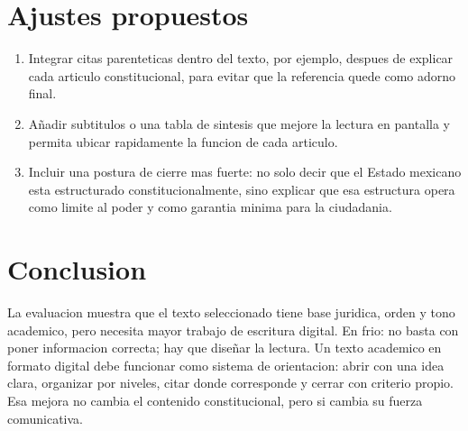 \documentclass[12pt,letterpaper,oneside]{article}
\begin{document}
\section{Ajustes propuestos}
\begin{enumerate}[label=\arabic*.]
    \item Integrar citas parenteticas dentro del texto, por ejemplo, despues de explicar cada articulo constitucional, para evitar que la referencia quede como adorno final.
    \item Añadir subtitulos o una tabla de sintesis que mejore la lectura en pantalla y permita ubicar rapidamente la funcion de cada articulo.
    \item Incluir una postura de cierre mas fuerte: no solo decir que el Estado mexicano esta estructurado constitucionalmente, sino explicar que esa estructura opera como limite al poder y como garantia minima para la ciudadania.
\end{enumerate}

\section{Conclusion}
La evaluacion muestra que el texto seleccionado tiene base juridica, orden y tono academico, pero necesita mayor trabajo de escritura digital. En frio: no basta con poner informacion correcta; hay que diseñar la lectura. Un texto academico en formato digital debe funcionar como sistema de orientacion: abrir con una idea clara, organizar por niveles, citar donde corresponde y cerrar con criterio propio. Esa mejora no cambia el contenido constitucional, pero si cambia su fuerza comunicativa.



\end{document}

